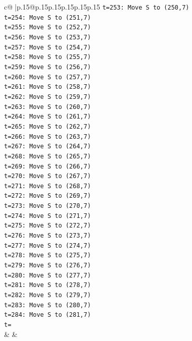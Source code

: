 \documentclass{article}
\begin{document}
{\begin{supertabular}{c@{$\;$}|p{.15\linewidth}@{}p{.15\linewidth}p{.15\linewidth}p{.15\linewidth}p{.15\linewidth}p{.15\linewidth}}
{{{\texttt{t=253: Move S to (250,7)} \\
\texttt{t=254: Move S to (251,7)} \\
\texttt{t=255: Move S to (252,7)} \\
\texttt{t=256: Move S to (253,7)} \\
\texttt{t=257: Move S to (254,7)} \\
\texttt{t=258: Move S to (255,7)} \\
\texttt{t=259: Move S to (256,7)} \\
\texttt{t=260: Move S to (257,7)} \\
\texttt{t=261: Move S to (258,7)} \\
\texttt{t=262: Move S to (259,7)} \\
\texttt{t=263: Move S to (260,7)} \\
\texttt{t=264: Move S to (261,7)} \\
\texttt{t=265: Move S to (262,7)} \\
\texttt{t=266: Move S to (263,7)} \\
\texttt{t=267: Move S to (264,7)} \\
\texttt{t=268: Move S to (265,7)} \\
\texttt{t=269: Move S to (266,7)} \\
\texttt{t=270: Move S to (267,7)} \\
\texttt{t=271: Move S to (268,7)} \\
\texttt{t=272: Move S to (269,7)} \\
\texttt{t=273: Move S to (270,7)} \\
\texttt{t=274: Move S to (271,7)} \\
\texttt{t=275: Move S to (272,7)} \\
\texttt{t=276: Move S to (273,7)} \\
\texttt{t=277: Move S to (274,7)} \\
\texttt{t=278: Move S to (275,7)} \\
\texttt{t=279: Move S to (276,7)} \\
\texttt{t=280: Move S to (277,7)} \\
\texttt{t=281: Move S to (278,7)} \\
\texttt{t=282: Move S to (279,7)} \\
\texttt{t=283: Move S to (280,7)} \\
\texttt{t=284: Move S to (281,7)} \\
\texttt{t=} \\
            }
        }
    }
    & & \\ \\


\end{supertabular}}
\end{document}
